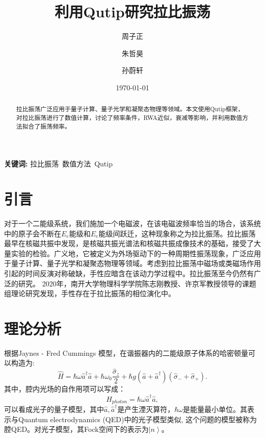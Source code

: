 \documentclass{ctexart}
\title{利用Qutip研究拉比振荡}
\author[1]{周子正}
\author[2]{朱哲昊}
\author[3]{孙蔚轩}
\affil[1]{物理科学学院, 南开大学}
\affil[2]{物理科学学院, 南开大学}
\affil[3]{金融学院, 南开大学}
\date{\today}
\begin{document}
\maketitle

\begin{abstract}
    拉比振荡广泛应用于量子计算、量子光学和凝聚态物理等领域。本文使用Qutip框架，对拉比振荡进行了数值计算，讨论了频率条件，RWA近似，衰减等影响，并利用数值方法拟合了振荡频率。
\end{abstract}

\textbf{关键词:} 拉比振荡\ 数值方法\ Qutip

\section{引言}
对于一个二能级系统，我们施加一个电磁波，在该电磁波频率恰当的场合，该系统中的原子会不断在$E_e$能级和$E_e$能级间跃迁，这种现象称之为拉比振荡\cite{zhu_vacuum_1990}。拉比振荡最早在核磁共振中发现，是核磁共振光谱法和核磁共振成像技术的基础，接受了大量实验的检验\cite{brune_quantum_1996}。广义地，它被定义为外场驱动下的一种周期性振荡现象，广泛应用于量子计算、量子光学和凝聚态物理等领域。考虑到拉比振荡中磁场或类磁场作用引起的时间反演对称破缺，手性应暗含在该动力学过程中。拉比振荡至今仍然有广泛的研究。
2020年，南开大学物理科学学院陈志刚教授、许京军教授领导的课题组理论研究发现，手性存在于拉比振荡的相位演化中\cite{zhang_unveiling_2020}。
\section{理论分析}
根据Jaynes - Fred Cummings 模型\cite{jaynes_comparison_1963}\cite{cummings_reminiscing_2013}，在谐振器内的二能级原子体系的哈密顿量可以构造为:
\begin{equation}
    \hat{H}=\hbar \omega \hat{a}^{\dagger} \hat{a}+\hbar \omega_{0} \frac{\hat{\sigma}_{z}}{2}+\hbar g\left(\hat{a} +\hat{a}^{\dagger} \right)\left(\hat{\sigma}_{-}+\hat{\sigma}_{+}\right).
    \label{equ:H}
\end{equation}
其中，腔内光场的自作用项可以写成：
\begin{equation}
    \hat{H}_{photon}=\hbar \omega \hat{a}^{\dagger} \hat{a},
    \label{equ:photon}
\end{equation}
可以看成光子的量子模型，其中$\hat{a},\hat{a}^\dagger$是产生湮灭算符，$\hbar\omega$是能量最小单位。其表示与Quantum electrodynamics (QED)中的光子模型类似, 这个问题的模型被称为腔QED。对光子模型，其Fock空间下的表示为$\left|n\right>$。
\end{document}
